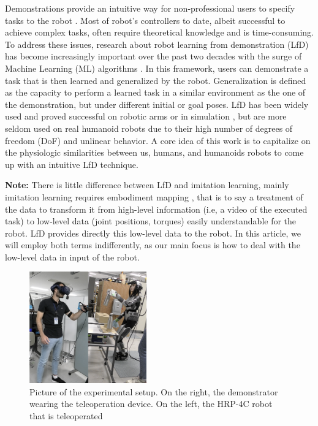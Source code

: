 \documentclass[conference]{IEEEtran}
\begin{document}
Demonstrations provide an intuitive way for non-professional users to specify tasks to the robot \cite{schaal_is_1999}. Most of robot's controllers to date, albeit successful to achieve complex tasks, often require theoretical knowledge and is time-consuming. To address these issues, research about robot learning from demonstration (LfD) has become increasingly important over the past two decades with the surge of Machine Learning (ML) algorithms \cite{argall_survey_2009} \cite{ravichandar_recent_2020}. In this framework, users can demonstrate a task that is then learned and generalized by the robot. Generalization is defined as the capacity to perform a learned task in a similar environment as the one of the demonstration, but under different initial or goal poses. LfD has been widely used and proved successful on robotic arms or in simulation \cite{pastor_learning_2009}, but are more seldom used on real humanoid robots \cite{calinon_learning_2007}due to their high number of degrees of freedom (DoF) and unlinear behavior. A core idea of this work is to capitalize on the physiologic similarities between us, humans, and humanoids robots to come up with an intuitive LfD technique.  

\textbf{Note:} There is little difference between LfD and imitation learning, mainly imitation learning requires embodiment mapping \cite{argall_survey_2009}, that is to say a treatment of the data to transform it from high-level information (i.e, a video of the executed task) to low-level data (joint positions, torques) easily understandable for the robot. LfD provides directly this low-level data to the robot. In this article, we will employ both terms indifferently, as our main focus is how to deal with the low-level data in input of the robot. \newline

\begin{figure}[ht]
  \centering
  \includegraphics[width=0.45\textwidth]{img/Setup.png}
  \caption{Picture of the experimental setup. On the right, the demonstrator wearing the teleoperation device. On the left, the HRP-4C robot that is teleoperated}
  \label{fig:setup}
\end{figure}
\end{document}
